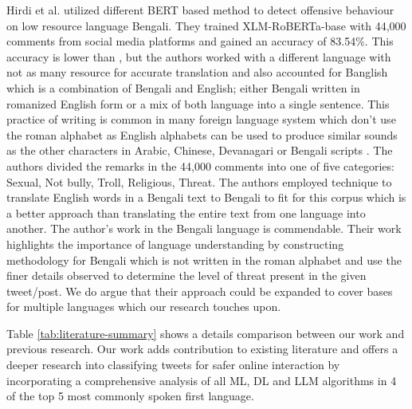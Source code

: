 Hirdi et al. \cite{offensive_behaviour} utilized different BERT based method to detect offensive behaviour on low resource language Bengali. They trained XLM-RoBERTa-base with 44,000 comments from social media platforms and gained an accuracy of 83.54\%. This accuracy is lower than \cite{sentiment_multilingual}, but the authors worked with a different language with not as many resource for accurate translation and also accounted for Banglish which is a combination of Bengali and English; either Bengali written in romanized English form or a mix of both language into a single sentence. This practice of writing is common in many foreign language system which don't use the roman alphabet as English alphabets can be used to produce similar sounds as the other characters in Arabic, Chinese, Devanagari or Bengali scripts \cite{devenglish}\cite{devenglish1}\cite{bengali}. The authors divided the remarks in the 44,000 comments into one of five categories: Sexual, Not bully, Troll, Religious, Threat. The authors employed technique to translate English words in a Bengali text to Bengali to fit for this corpus which is a better approach than translating the entire text from one language into another. The author's work in the Bengali language is commendable. Their work highlights the importance of language understanding by constructing methodology for Bengali which is not written in the roman alphabet and use the finer details observed to determine the level of threat present in the given tweet/post. We do argue that their approach could be expanded to cover bases for multiple languages which our research touches upon. 


Table \ref{tab:literature-summary} shows a details comparison between our work and previous research. Our work adds contribution to existing literature and offers a deeper research into classifying tweets for safer online interaction by incorporating a comprehensive analysis of all ML, DL and LLM algorithms in 4 of the top 5 most commonly spoken first language.